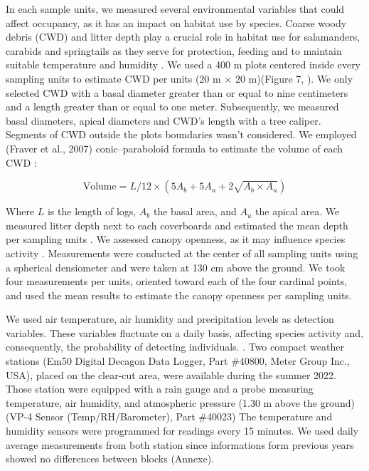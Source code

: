 In each sample units, we measured several environmental variables that could affect occupancy, as it has an impact on habitat use by species.
Coarse woody debris (CWD) and litter depth play a crucial role in habitat use for salamanders, carabids and springtails as
they serve for protection, feeding and to maintain suitable temperature and humidity \citep{birdChangesSoilLitter2004,groverInfluenceCoverMoisture1998a,harmonEcologyCoarseWoody1986,koivula.LeafLitterSmallscale1999,mckennyEffectsStructuralComplexity2006,patrickEffectsExperimentalForestry2006a}. 
We used a 400 m plots centered inside every sampling units to estimate CWD per units (20 m $\times$  20 m)(Figure 7, \citealp{methotGuideInventaireEchantillonnage2014}). 
We only selected CWD with a basal diameter greater than or equal to nine centimeters and a length greater than or equal to one meter.
Subsequently, we measured basal diameters, apical diameters and CWD's length with a tree caliper. 
Segments of CWD outside the plots boundaries wasn't considered.
We employed (Fraver et al., 2007) conic–paraboloid formula to estimate the volume of each CWD :

\begin{equation}
  \text{Volume} = L/12 \times (5A_b + 5A_u + 2\sqrt{A_b \times A_u})
\end{equation}


Where $L$ is the length of logs, $A_b$ the basal area, and $A_u$ the apical area.
We measured litter depth next to each coverboards and estimated the mean depth per sampling units \citep{mazerolleWoodlandSalamanderPopulation2021a}. 
We assessed canopy openness, as it may influence species activity \citep{henneronForestPlantCommunity2017,koivulaBorealCarabidbeetleColeoptera2002a,kotzeFortyYearsCarabid2011a,messereForestFloorDistribution1998,tilghmanMetaanalysisEffectsCanopy2012}.
Measurements were conducted at the center of all sampling units using a spherical densiometer \citep{lemmonSphericalDensiometerEstimating1956} and were taken at 130 cm above the ground. 
We took four measurements per units, oriented toward each of the four cardinal points, and used the mean results to estimate the canopy openness per sampling units.

We used air temperature, air humidity and precipitation levels as detection variables.
These variables fluctuate on a daily basis, affecting species activity and, consequently, the probability of detecting individuals. 
\citep{butterfieldCarabidLifeCycle1996,kotzeFortyYearsCarabid2011a,loveiEcologyBehaviorGround1996,odonnellPredictingVariationMicrohabitat2014a,spotilaRoleTemperatureWater1972}.
Two compact weather stations (Em50 Digital Decagon Data Logger, Part \#40800, Meter Group Inc., USA), placed on the clear-cut area, were available during the summer 2022.
Those station were equipped with a rain gauge and a probe measuring temperature, air humidity, and atmospheric pressure (1.30 m above the ground)(VP-4 Sensor (Temp/RH/Barometer), Part \#40023)
The temperature and humidity sensors were programmed for readings every 15 minutes. 
We used daily average measurements from both station since informations form previous years showed no differences between blocks (Annexe).

